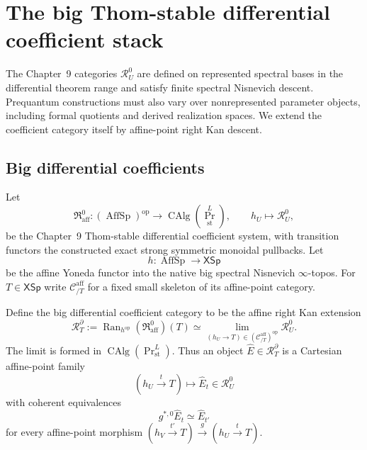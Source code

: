 \section{The big Thom-stable differential coefficient stack}
\label{sec:prequantum-big-differential-curvature}

The Chapter~9 categories $\mathcal R_U^0$ are defined on represented spectral
bases in the differential theorem range and satisfy finite spectral Nisnevich
descent.  Prequantum constructions must also vary over nonrepresented parameter
objects, including formal quotients and derived realization spaces.  We extend the
coefficient category itself by affine-point right Kan descent.

\subsection{Big differential coefficients}
\label{subsec:prequantum-big-differential-coefficients}

Let
\[
\mathfrak R^{0}_{\mathrm{aff}}:
(\operatorname{AffSp})^{\mathrm{op}}
\longrightarrow
\operatorname{CAlg}(\operatorname{Pr}^{L}_{\mathrm{st}}),
\qquad
h_U\longmapsto\mathcal R_U^0,
\]
be the Chapter~9 Thom-stable differential coefficient system, with transition
functors the constructed exact strong symmetric monoidal pullbacks.  Let
\[
h:\operatorname{AffSp}\longrightarrow\mathsf{XSp}
\]
be the affine Yoneda functor into the native big spectral Nisnevich
$\infty$-topos.  For $T\in\mathsf{XSp}$ write
$\mathcal C^{\mathrm{aff}}_{/T}$ for a fixed small skeleton of its affine-point
category.

\begin{definition}
\label{def:prequantum-big-differential-coefficient-category}
Define the big differential coefficient category to be the affine right Kan
extension
\[
\boxed{
\mathcal R_T^{\partial}
:=
\operatorname{Ran}_{h^{\mathrm{op}}}
(\mathfrak R^{0}_{\mathrm{aff}})(T)
\simeq
\lim_{(h_U\to T)\in
      (\mathcal C^{\mathrm{aff}}_{/T})^{\mathrm{op}}}
\mathcal R_U^0.
}
\]
The limit is formed in
$\operatorname{CAlg}(\operatorname{Pr}^{L}_{\mathrm{st}})$.  Thus an object
$\widehat E\in\mathcal R_T^{\partial}$ is a Cartesian affine-point family
\[
(h_U\xrightarrow{t}T)\longmapsto\widehat E_t\in\mathcal R_U^0
\]
with coherent equivalences
\[
g^{*,0}\widehat E_t\simeq\widehat E_{t'}
\]
for every affine-point morphism
$(h_V\xrightarrow{t'}T)\xrightarrow{g}(h_U\xrightarrow{t}T)$.
\end{definition}

